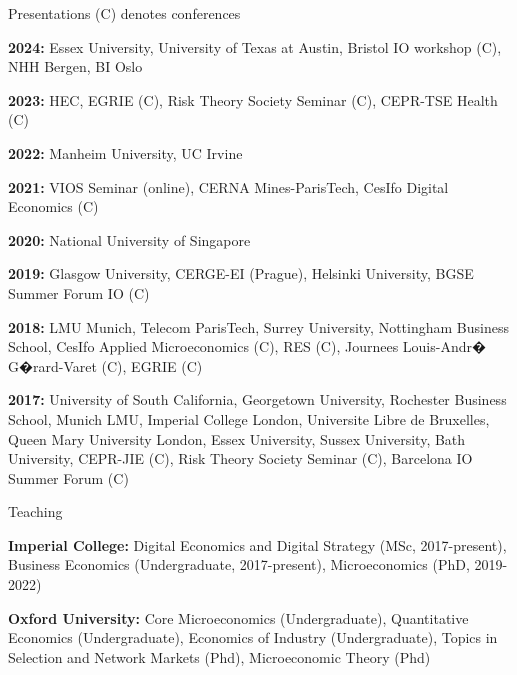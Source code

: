\documentclass{resume}
\begin{document}
\begin{rSection}{Presentations \tiny{(C) denotes conferences}}

\textbf{2024:} Essex University, University of Texas at Austin, Bristol IO workshop (C), NHH Bergen, BI Oslo

\textbf{2023:} HEC, EGRIE (C), Risk Theory Society Seminar (C), CEPR-TSE Health (C)

\textbf{2022:} Manheim University, UC Irvine

\textbf{2021:} VIOS Seminar (online), CERNA Mines-ParisTech, CesIfo Digital Economics (C)

\textbf{2020:} National University of Singapore

\textbf{2019:} Glasgow University, CERGE-EI (Prague), Helsinki University, BGSE Summer Forum IO (C)

\textbf{2018:} LMU Munich, Telecom ParisTech, Surrey University, Nottingham Business School, 
CesIfo Applied Microeconomics (C), RES (C), Journees Louis-Andr� G�rard-Varet (C), EGRIE (C)

\textbf{2017:} University of South California, Georgetown University, Rochester Business School, Munich LMU, 
Imperial College London, Universite Libre de Bruxelles, Queen Mary University London, 
Essex University, Sussex University, Bath University, CEPR-JIE (C), 
Risk Theory Society Seminar (C), Barcelona IO Summer Forum (C) 

\end{rSection}


\begin{rSection}{Teaching}

\textbf{Imperial College:} Digital Economics and Digital Strategy (MSc, 2017-present), Business Economics (Undergraduate, 2017-present), Microeconomics (PhD, 2019-2022)

\textbf{Oxford University:} Core Microeconomics (Undergraduate), Quantitative Economics (Undergraduate), Economics of Industry (Undergraduate), Topics in Selection and Network Markets (Phd), Microeconomic Theory (Phd)

\end{rSection}




\end{document}
